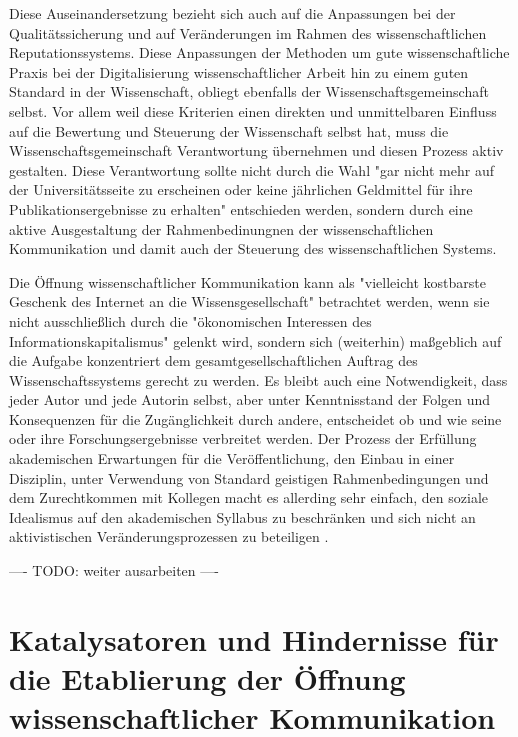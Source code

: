 Diese Auseinandersetzung bezieht sich auch auf die Anpassungen bei der Qualitätssicherung und auf Veränderungen im Rahmen des wissenschaftlichen Reputationssystems. Diese Anpassungen der Methoden um gute wissenschaftliche Praxis bei der Digitalisierung wissenschaftlicher Arbeit hin zu einem guten Standard in der Wissenschaft, obliegt ebenfalls der Wissenschaftsgemeinschaft selbst. Vor allem weil diese Kriterien einen direkten und unmittelbaren Einfluss auf die Bewertung und Steuerung der Wissenschaft selbst hat, muss die Wissenschaftsgemeinschaft Verantwortung übernehmen und diesen Prozess aktiv gestalten. Diese Verantwortung sollte nicht durch die Wahl "gar nicht mehr auf der Universitätsseite zu erscheinen oder keine jährlichen Geldmittel für ihre Publikationsergebnisse zu erhalten" \cite{Warnke_2012} entschieden werden, sondern durch eine aktive Ausgestaltung der Rahmenbedinungnen der wissenschaftlichen Kommunikation und damit auch der Steuerung des wissenschaftlichen Systems.

Die Öffnung wissenschaftlicher Kommunikation kann als "vielleicht kostbarste Geschenk des Internet an die Wissensgesellschaft" betrachtet werden, wenn sie nicht ausschließlich durch die "ökonomischen Interessen des Informationskapitalismus" \cite{hagner_2015_sache_buches} gelenkt wird, sondern sich (weiterhin) maßgeblich auf die Aufgabe konzentriert dem gesamtgesellschaftlichen Auftrag des Wissenschaftssystems gerecht zu werden. Es bleibt auch eine Notwendigkeit, dass jeder Autor und jede Autorin selbst, aber unter Kenntnisstand der Folgen und Konsequenzen für die Zugänglichkeit durch andere, entscheidet ob und wie seine oder ihre Forschungsergebnisse verbreitet werden. Der Prozess der Erfüllung akademischen Erwartungen für die Veröffentlichung, den Einbau in einer Disziplin, unter Verwendung von Standard geistigen Rahmenbedingungen und dem Zurechtkommen mit Kollegen macht es allerding sehr einfach, den soziale Idealismus auf den akademischen Syllabus zu beschränken und sich nicht an aktivistischen Veränderungsprozessen zu beteiligen \cite[:25]{flood_2013_combining}.

---- TODO: weiter ausarbeiten ----

\section{Katalysatoren und Hindernisse für die Etablierung der Öffnung wissenschaftlicher Kommunikation}

